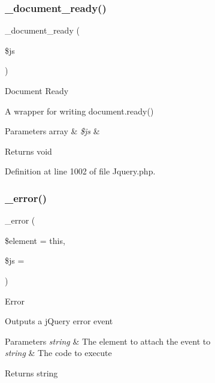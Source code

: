 \subsubsection{\texorpdfstring{\_document\_ready()}{\_document\_ready()}}
{\footnotesize\ttfamily \+\_\+document\+\_\+ready (\begin{DoxyParamCaption}\item[{}]{\$js }\end{DoxyParamCaption})\hspace{0.3cm}{\ttfamily [protected]}}

Document Ready

A wrapper for writing document.\+ready()


\begin{DoxyParams}[1]{Parameters}
array & {\em \$js} & \\
\hline
\end{DoxyParams}
\begin{DoxyReturn}{Returns}
void 
\end{DoxyReturn}


Definition at line 1002 of file Jquery.\+php.

\mbox{\label{class_c_i___jquery_a8731ec925abaf39ed5e8635365c6512d}} 
\subsubsection{\texorpdfstring{\_error()}{\_error()}}
{\footnotesize\ttfamily \+\_\+error (\begin{DoxyParamCaption}\item[{}]{\$element = {\ttfamily \textquotesingle{}this\textquotesingle{}},  }\item[{}]{\$js = {\ttfamily \textquotesingle{}\textquotesingle{}} }\end{DoxyParamCaption})\hspace{0.3cm}{\ttfamily [protected]}}

Error

Outputs a j\+Query error event


\begin{DoxyParams}{Parameters}
{\em string} & The element to attach the event to \\
\hline
{\em string} & The code to execute \\
\hline
\end{DoxyParams}
\begin{DoxyReturn}{Returns}
string 
\end{DoxyReturn}


